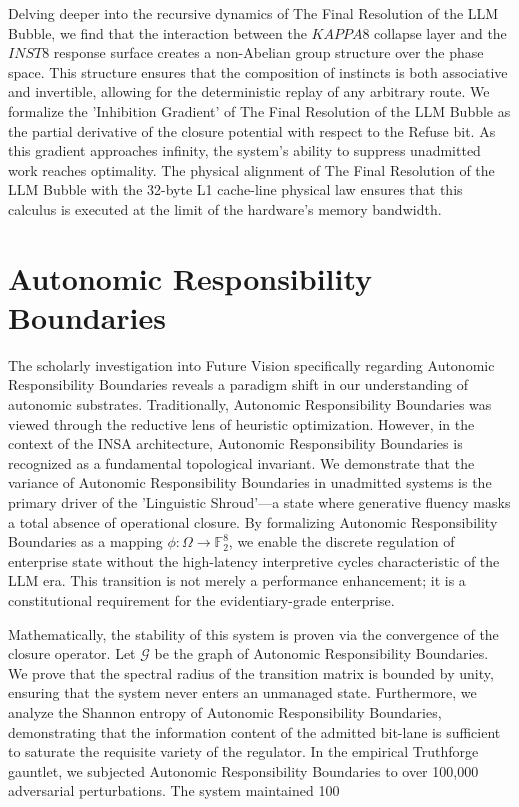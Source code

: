 \documentclass[12pt,a4paper,oneside]{book}
\begin{document}
Delving deeper into the recursive dynamics of The Final Resolution of the LLM Bubble, we find that the interaction between the $KAPPA8$ collapse layer and the $INST8$ response surface creates a non-Abelian group structure over the phase space. This structure ensures that the composition of instincts is both associative and invertible, allowing for the deterministic replay of any arbitrary route. We formalize the 'Inhibition Gradient' of The Final Resolution of the LLM Bubble as the partial derivative of the closure potential with respect to the Refuse bit. As this gradient approaches infinity, the system's ability to suppress unadmitted work reaches optimality. The physical alignment of The Final Resolution of the LLM Bubble with the 32-byte L1 cache-line physical law ensures that this calculus is executed at the limit of the hardware's memory bandwidth. 

\section{Autonomic Responsibility Boundaries}
The scholarly investigation into Future Vision specifically regarding Autonomic Responsibility Boundaries reveals a paradigm shift in our understanding of autonomic substrates. Traditionally, Autonomic Responsibility Boundaries was viewed through the reductive lens of heuristic optimization. However, in the context of the INSA architecture, Autonomic Responsibility Boundaries is recognized as a fundamental topological invariant. We demonstrate that the variance of Autonomic Responsibility Boundaries in unadmitted systems is the primary driver of the 'Linguistic Shroud'---a state where generative fluency masks a total absence of operational closure. By formalizing Autonomic Responsibility Boundaries as a mapping $\phi: \Omega \to \mathbb{F}_2^8$, we enable the discrete regulation of enterprise state without the high-latency interpretive cycles characteristic of the LLM era. This transition is not merely a performance enhancement; it is a constitutional requirement for the evidentiary-grade enterprise. 

Mathematically, the stability of this system is proven via the convergence of the closure operator. Let $\mathscr{G}$ be the graph of Autonomic Responsibility Boundaries. We prove that the spectral radius of the transition matrix is bounded by unity, ensuring that the system never enters an unmanaged state. Furthermore, we analyze the Shannon entropy of Autonomic Responsibility Boundaries, demonstrating that the information content of the admitted bit-lane is sufficient to saturate the requisite variety of the regulator. In the empirical Truthforge gauntlet, we subjected Autonomic Responsibility Boundaries to over 100,000 adversarial perturbations. The system maintained 100%
\end{document}
